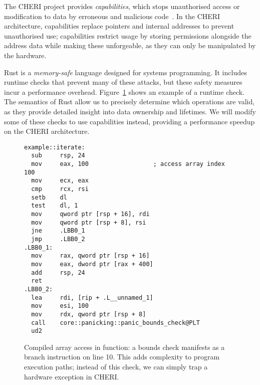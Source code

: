 \documentclass[11pt]{article}
\begin{document}
The CHERI project provides \emph{capabilities}, which stops unauthorised access or modification to data by erroneous and malicious code~\cite{cheri-v6}.
In the CHERI architecture, capabilities replace pointers and internal addresses to prevent unauthorised use; capabilities restrict usage by storing permissions alongside the address data while making these unforgeable, as they can only be manipulated by the hardware.

Rust is a \emph{memory-safe} language designed for systems programming.
It includes runtime checks that prevent many of these attacks, but these safety measures incur a performance overhead.
Figure~\ref{lst:array-check} shows an example of a runtime check.
The semantics of Rust allow us to precisely determine which operations are valid, as they provide detailed insight into data ownership and lifetimes.
We will modify some of these checks to use capabilities instead, providing a performance speedup on the CHERI architecture.

\begin{figure}[ht]
\begin{lstlisting}
example::iterate:
  sub     rsp, 24
  mov     eax, 100                  ; access array index 100
  mov     ecx, eax
  cmp     rcx, rsi
  setb    dl
  test    dl, 1
  mov     qword ptr [rsp + 16], rdi
  mov     qword ptr [rsp + 8], rsi
  jne     .LBB0_1
  jmp     .LBB0_2
.LBB0_1:
  mov     rax, qword ptr [rsp + 16]
  mov     eax, dword ptr [rax + 400]
  add     rsp, 24
  ret
.LBB0_2:
  lea     rdi, [rip + .L__unnamed_1]
  mov     esi, 100
  mov     rdx, qword ptr [rsp + 8]
  call    core::panicking::panic_bounds_check@PLT
  ud2
\end{lstlisting}
\caption{Compiled array access in function: a bounds check manifests as a branch instruction on line 10. This adds complexity to program execution paths; instead of this check, we can simply trap a hardware exception in CHERI.}
\label{lst:array-check}
\end{figure}
\end{document}
